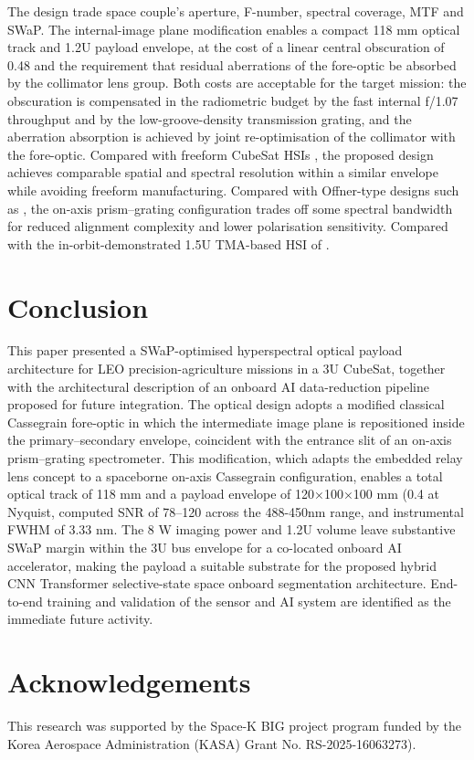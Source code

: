 \documentclass{iac}
\begin{document}
The design trade space couple’s aperture, F-number, spectral coverage, MTF and SWaP. The internal-image plane modification enables a compact 118 mm optical track and 1.2U payload envelope, at the cost of a linear central obscuration of 0.48 and the requirement that residual aberrations of the fore-optic be absorbed by the collimator lens group. Both costs are acceptable for the target mission: the obscuration is compensated in the radiometric budget by the fast internal f/1.07 throughput and by the low-groove-density transmission grating, and the aberration absorption is achieved by joint re-optimisation of the collimator with the fore-optic. Compared with freeform CubeSat HSIs \cite{liu2021freeform}, the proposed design achieves comparable spatial and spectral resolution within a similar envelope while avoiding freeform manufacturing. Compared with Offner-type designs such as \cite{lee2008optical}, the on-axis prism–grating configuration trades off some spectral bandwidth for reduced alignment complexity and lower polarisation sensitivity. Compared with the in-orbit-demonstrated 1.5U TMA-based HSI of \cite{esposito2019inorbit}.
\section{Conclusion}
This paper presented a SWaP-optimised hyperspectral optical payload architecture for LEO precision-agriculture missions in a 3U CubeSat, together with the architectural description of an onboard AI data-reduction pipeline proposed for future integration. The optical design adopts a modified classical Cassegrain fore-optic in which the intermediate image plane is repositioned inside the primary–secondary envelope, coincident with the entrance slit of an on-axis prism–grating spectrometer. This modification, which adapts the embedded relay lens concept \cite{hsieh2011erlhis} to a spaceborne on-axis Cassegrain configuration, enables a total optical track of 118 mm and a payload envelope of 120×100×100 mm (0.4 at Nyquist, computed SNR of 78–120 across the 488-450nm range, and instrumental FWHM of 3.33 nm. The 8 W imaging power and 1.2U volume leave substantive SWaP margin within the 3U bus envelope for a co-located onboard AI accelerator, making the payload a suitable substrate for the proposed hybrid CNN Transformer selective-state space onboard segmentation architecture. End-to-end training and validation of the sensor and AI system are identified as the immediate future activity.
\section{Acknowledgements}
This research was supported by the Space-K BIG project program funded by the Korea Aerospace Administration (KASA) Grant No. RS-2025-16063273).
\nocite{*}

\printbibliography
\end{document}
